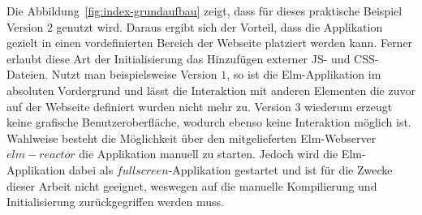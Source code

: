 Die Abbildung~\ref{fig:index-grundaufbau} zeigt, dass für dieses praktische Beispiel Version $2$ genutzt wird. Daraus ergibt sich der Vorteil, dass die Applikation gezielt in einen vordefinierten Bereich der Webseite platziert werden kann. Ferner erlaubt diese Art der Initialisierung das Hinzufügen externer \ac{JS}- und \ac{CSS}-Dateien.
Nutzt man beispielsweise Version $1$, so ist die Elm-Applikation im absoluten Vordergrund und lässt die Interaktion mit anderen Elementen die zuvor auf der Webseite definiert wurden nicht mehr zu. Version $3$ wiederum erzeugt keine grafische Benutzeroberfläche, wodurch ebenso keine Interaktion möglich ist.
Wahlweise besteht die Möglichkeit über den mitgelieferten Elm-Webserver $elm-reactor$ die Applikation manuell zu starten. Jedoch wird die Elm-Applikation dabei als $fullscreen$-Applikation gestartet und ist für die Zwecke dieser Arbeit nicht geeignet, weswegen auf die manuelle Kompilierung und Initialisierung zurückgegriffen werden muss.

